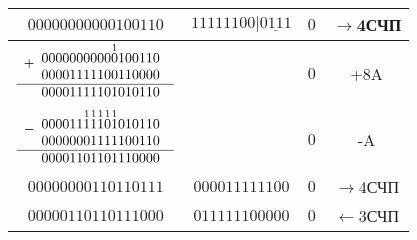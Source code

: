 \documentclass[12pt,a4paper]{report}
\begin{document}
\begin{tabular}{|c|c|c|c|}
    \hline
    $00000000000100110$ & $11111100|\underline{0111}$ & $0$ & $\rightarrow$4СЧП\\
    \hline
        $
            \begin{array}{r}
            +
            \begin{array}{r}
            0000000000\overset{\small{1}}{0}100110\\
            00001111100110000
            \end{array}\\
            \hline
            \begin{array}{r}
            00001111101010110
            \end{array}\\
            \end{array}
        $ & & $0$ & +8A\\
    \hline
        $
            \begin{array}{r}
            -
            \begin{array}{r}
            000011\overset{\small{1}}{1}\overset{\small{1}}{1}\overset{\small{1}}{1}\overset{\small{1}}{0}\overset{\small{1}}{1}010110\\
            00000001111100110
            \end{array}\\
            \hline
            \begin{array}{r}
            00001101101110000
            \end{array}\\
            \end{array}
        $ & & $0$ & -A\\
    \hline
    $00000000110110111$ & $000011111100$ & $0$ & $\rightarrow$4СЧП\\
    \hline
    $00000110110111000$ & $011111100000$ & $0$ & $\leftarrow$3СЧП\\
    \hline
    \end{tabular}\\
\end{document}
